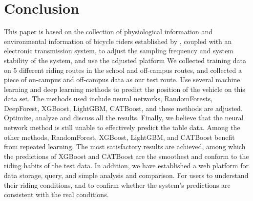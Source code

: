 \documentclass[conference]{IEEEtran}
\begin{document}
\section{Conclusion}
This paper is based on the collection of physiological information and environmental information of bicycle riders established by \cite{9026293}, coupled with an electronic transmission system, to adjust the sampling frequency and system stability of the system, and use the adjusted platform We collected training data on 5 different riding routes in the school and off-campus routes, and collected a piece of on-campus and off-campus data as our test route. Use several machine learning and deep learning methods to predict the position of the vehicle on this data set. The methods used include neural networks, RandomForests, DeepForest, XGBoost, LightGBM, CATBoost, and these methods are adjusted. Optimize, analyze and discuss all the results. Finally, we believe that the neural network method is still unable to effectively predict the table data. Among the other methods, RandomForest, XGBoost, LightGBM, and CATBoost benefit from repeated learning. The most satisfactory results are achieved, among which the predictions of XGBoost and CATBoost are the smoothest and conform to the riding habits of the test data. In addition, we have established a web platform for data storage, query, and simple analysis and comparison. For users to understand their riding conditions, and to confirm whether the system’s predictions are consistent with the real conditions.
{}

\end{document}
